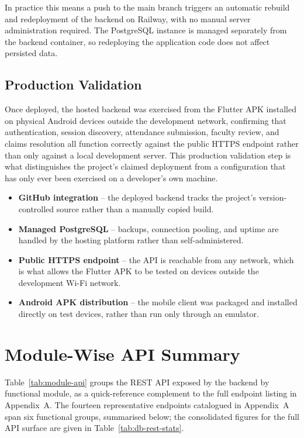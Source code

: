 \documentclass[12pt, a4paper, oneside]{report}
\begin{document}
In practice this means a push to the main branch triggers an automatic rebuild and redeployment of the backend on Railway, with no manual server administration required. The PostgreSQL instance is managed separately from the backend container, so redeploying the application code does not affect persisted data.

\subsection{Production Validation}

Once deployed, the hosted backend was exercised from the Flutter APK installed on physical Android devices outside the development network, confirming that authentication, session discovery, attendance submission, faculty review, and claims resolution all function correctly against the public HTTPS endpoint rather than only against a local development server. This production validation step is what distinguishes the project's claimed deployment from a configuration that has only ever been exercised on a developer's own machine.

\begin{itemize}
    \item \textbf{GitHub integration} -- the deployed backend tracks the project's version-controlled source rather than a manually copied build.
    \item \textbf{Managed PostgreSQL} -- backups, connection pooling, and uptime are handled by the hosting platform rather than self-administered.
    \item \textbf{Public HTTPS endpoint} -- the API is reachable from any network, which is what allows the Flutter APK to be tested on devices outside the development Wi-Fi network.
    \item \textbf{Android APK distribution} -- the mobile client was packaged and installed directly on test devices, rather than run only through an emulator.
\end{itemize}

\section{Module-Wise API Summary}

Table~\ref{tab:module-api} groups the REST API exposed by the backend by functional module, as a quick-reference complement to the full endpoint listing in Appendix~A. The fourteen representative endpoints catalogued in Appendix~A span six functional groups, summarised below; the consolidated figures for the full API surface are given in Table~\ref{tab:db-rest-stats}.
\end{document}

